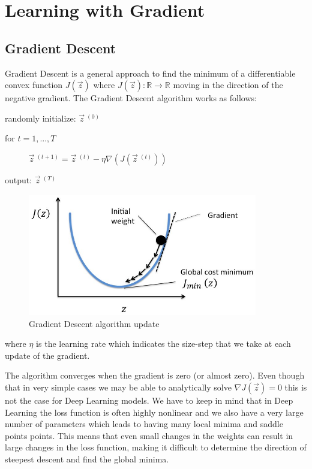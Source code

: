 \chapter{Learning with Gradient}

\section{Gradient Descent}

Gradient Descent is a general approach to find the minimum of a differentiable convex function $J(\Vec{z})$ where $J (\Vec{z}): \mathbb{R} \rightarrow \mathbb{R} $ moving in the direction of the negative gradient. The Gradient Descent algorithm works as follows:

randomly initialize: $\Vec{z}~^{(0)}$

for $t = 1, ..., T$

~~~~~ $\Vec{z}~^{(t+1)} = \Vec{z}~^{(t)} - \eta \nabla(J(\Vec{z}~^{(t)})) $

output: $ \Vec{z}~^{(T)} $

\begin{figure}[h]
    \centering
    \includegraphics[width=10cm]{Images/gradient_descent.jpg}
    \caption{Gradient Descent algorithm update}
\end{figure}

where $\eta$ is the learning rate which indicates the size-step that we take at each update of the gradient.

\noindent The algorithm converges when the gradient is zero (or almost zero). Even though that in very simple cases we may be able to analytically solve $ \nabla J(\Vec{z}) = 0$ this is not the case for Deep Learning models. We have to keep in mind that in Deep Learning the loss function is often highly nonlinear and we also have a very large number of parameters which leads to having  many local minima and saddle points points. This means that even small changes in the weights can result in large changes in the loss function, making it difficult to determine the direction of steepest descent and find the global minima. 

